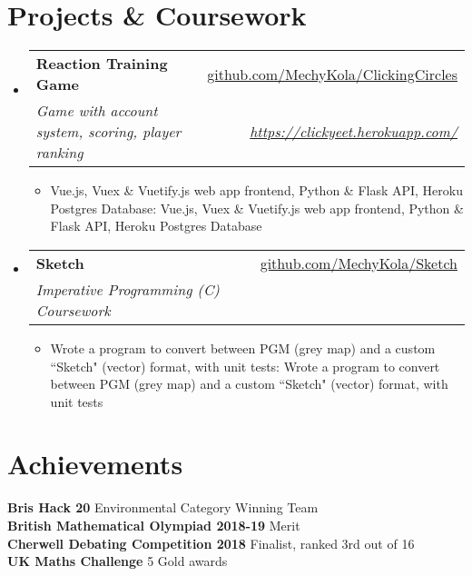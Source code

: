 \documentclass[a4paper,11pt]{article}
\makeatletter
\def \ifempty#1{\def\temp{#1} \ifx\temp\empty }
\newcommand{\resumeItem}[2]{
  \item\small{
  	\ifempty{#1}#2\else\textbf{#1}{: #2 \vspace{-2pt}}\fi
  }
}
\newcommand{\resumeSubheading}[4]{
  \vspace{-1pt}\item
    \begin{tabular*}{0.97\textwidth}{l@{\extracolsep{\fill}}r}
      \textbf{#1} & #2 \\
      \textit{\small#3} & \textit{\small #4} \\
    \end{tabular*}\vspace{-5pt}
}
\newcommand{\resumeSubHeadingListStart}{\begin{itemize}[leftmargin=*]}
\newcommand{\resumeSubHeadingListEnd}{\end{itemize}}
\newcommand{\resumeItemListStart}{\begin{itemize}}
\newcommand{\resumeItemListEnd}{\end{itemize}\vspace{-5pt}}
\makeatother
\begin{document}
\section{Projects \& Coursework}
  \resumeSubHeadingListStart
    \resumeSubheading
      {Reaction Training Game}{\href{https://github.com/MechyKola/ClickingCircles}
      {github.com/MechyKola/ClickingCircles}}
      {Game with account system, scoring, player ranking}{\href{https://clickyeet.herokuapp.com/}
      {https://clickyeet.herokuapp.com/}}
      \resumeItemListStart
        \resumeItem{}
          {Vue.js, Vuex \& Vuetify.js web app frontend, Python \& Flask API, Heroku Postgres Database}
      \resumeItemListEnd
    \resumeSubheading
      {Sketch}{\href{https://github.com/MechyKola/Sketch}
      {github.com/MechyKola/Sketch}}
      {Imperative Programming (C) Coursework}{}
      \resumeItemListStart
        \resumeItem{}
          {Wrote a program to convert between PGM (grey map) and a custom ``Sketch" (vector) format, with unit tests}
      \resumeItemListEnd
  \resumeSubHeadingListEnd


\section{Achievements}
  \textbf{Bris Hack 20}{ Environmental Category Winning Team} \\
  \textbf{British Mathematical Olympiad 2018-19}{ Merit} \\
  \textbf{Cherwell Debating Competition 2018}{ Finalist, ranked 3rd out of 16} \\
  \textbf{UK Maths Challenge}{ 5 Gold  awards} \\
  
  
\end{document}
